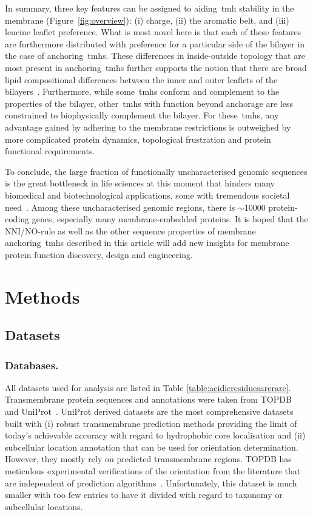 In summary, three key features can be assigned to aiding~\gls{tmh} stability in the membrane (Figure~\ref{fig:overview}): (i) charge, (ii) the aromatic belt, and (iii) leucine leaflet preference.
What is most novel here is that each of these features are furthermore distributed with preference for a particular side of the bilayer in the case of anchoring~\gls{tmh}s.
These differences in inside-outside topology that are most present in anchoring~\gls{tmh}s further supports the notion that there are broad lipid compositional differences between the inner and outer leaflets of the bilayers~\cite{Sharpe2010}.
Furthermore, while some~\gls{tmh}s conform and complement to the properties of the bilayer, other~\gls{tmh}s with function beyond anchorage are less constrained to biophysically complement the bilayer.
For these~\gls{tmh}s, any advantage gained by adhering to the membrane restrictions is outweighed by more complicated protein dynamics, topological frustration and protein functional requirements.

To conclude, the large fraction of functionally uncharacterised genomic sequences is the great bottleneck in life sciences at this moment that hinders many biomedical and biotechnological applications, some with tremendous societal need~\cite{Eisenhaber2012,Kuznetsov2013}.
Among these uncharacterised genomic regions, there is \(\sim\)10000 protein-coding genes, especially many membrane-embedded proteins.
It is hoped that the NNI/NO-rule as well as the other sequence properties of membrane anchoring~\gls{tmh}s described in this article will add new insights for membrane protein function discovery, design and engineering.

\section{Methods}

\subsection{Datasets}
\subsubsection{Databases.}
All datasets used for analysis are listed in Table \ref{table:acidicresiduesarerare}.
Transmembrane protein sequences and annotations were taken from TOPDB~\cite{Dobson2015} and UniProt~\cite{TheUniProtConsortium2014}.
UniProt derived datasets are the most comprehensive datasets built with (i) robust transmembrane prediction methods providing the limit of today’s achievable accuracy with regard to hydrophobic core localisation and (ii) subcellular location annotation that can be used for orientation determination.
However, they mostly rely on predicted transmembrane regions.
TOPDB has meticulous experimental verifications of the orientation from the literature that are independent of prediction algorithms~\cite{Dobson2015}.
Unfortunately, this dataset is much smaller with too few entries to have it divided with regard to taxonomy or subcellular locations.


